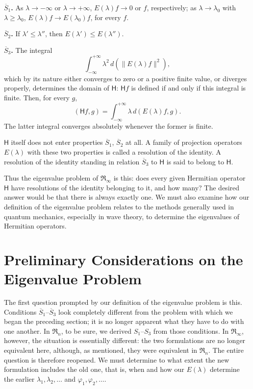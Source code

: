 \documentclass[fontsize=13pt,twoside,openany,headings=normal,parskip=false,bookmarkpackage=false,DIV=calc]{scrbook}
\begin{document}
\leavevmode{}\textbf{$\overline{S}_1$.}\label{cond:II.Sbar1} As $\lambda\to-\infty$ or $\lambda\to+\infty$, $E(\lambda)f\to0$ or $f$, respectively; as $\lambda\to\lambda_0$ with $\lambda\geq\lambda_0$, $E(\lambda)f\to E(\lambda_0)f$, for every $f$.

\leavevmode{}\textbf{$\overline{S}_2$.}\label{cond:II.Sbar2} If $\lambda'\leq\lambda''$, then $E(\lambda')\leq E(\lambda'')$.

\hypertarget{origpage-62}{}%
\leavevmode{}\textbf{$\overline{S}_3$.}\label{cond:II.Sbar3} The integral
\[
\int_{-\infty}^{+\infty}\lambda^2\,d(\|E(\lambda)f\|^2),
\]
which by its nature either converges to zero or a positive finite value, or diverges properly, determines the domain of $\mathsf H$: $\mathsf Hf$ is defined if and only if this integral is finite. Then, for every $g$,
\[
(\mathsf Hf,g)=\int_{-\infty}^{+\infty}\lambda\,d(E(\lambda)f,g).
\]
The latter integral converges absolutely whenever the former is finite.

$\mathsf H$ itself does not enter properties $\hyperref[cond:II.Sbar1]{\overline{S}_1}$, $\hyperref[cond:II.Sbar2]{\overline{S}_2}$ at all. A family of projection operators $E(\lambda)$ with these two properties is called a resolution of the identity. A resolution of the identity standing in relation $\hyperref[cond:II.Sbar3]{\overline{S}_3}$ to $\mathsf H$ is said to belong to $\mathsf H$.

Thus the eigenvalue problem of $\mathfrak{R}_\infty$ is this: does every given Hermitian operator $\mathsf H$ have resolutions of the identity belonging to it, and how many? The desired answer would be that there is always exactly one. We must also examine how our definition of the eigenvalue problem relates to the methods generally used in quantum mechanics, especially in wave theory, to determine the eigenvalues of Hermitian operators.

\section{Preliminary Considerations on the Eigenvalue Problem}\label{sec:II.8}
The first question prompted by our definition of the eigenvalue problem is this. Conditions $\hyperref[cond:II.Sbar1]{\overline{S}_1}$--$\hyperref[cond:II.Sbar3]{\overline{S}_3}$ look completely different from the problem with which we began the preceding section; it is no longer apparent what they have to do with one another. In $\mathfrak{R}_n$, to be sure, we derived $\hyperref[cond:II.S1]{S_1}$--$\hyperref[cond:II.S3]{S_3}$ from those conditions. In $\mathfrak{R}_\infty$, however, the situation is essentially different: the two formulations are no longer equivalent here, although, as mentioned, they were equivalent in $\mathfrak{R}_n$. The entire question is therefore reopened. We must determine to what extent the new formulation includes the old one, that is, when and how our $E(\lambda)$ determine the earlier $\lambda_1,\lambda_2,\ldots$ and $\varphi_1,\varphi_2,\ldots$.
\end{document}
